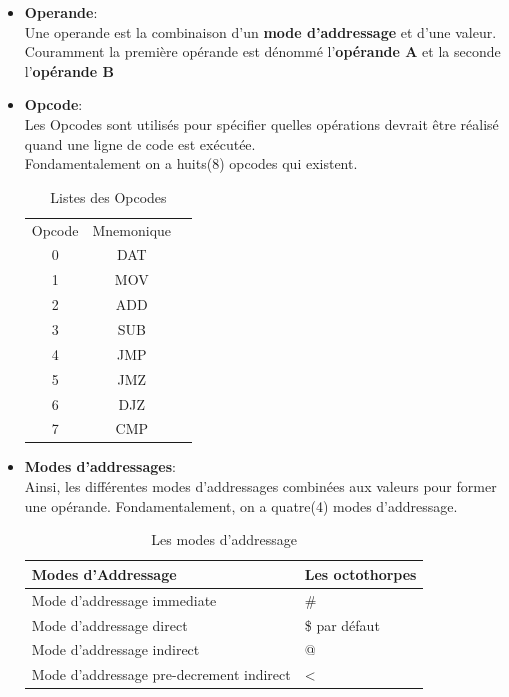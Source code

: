 \documentclass[12pt]{article}
\begin{document}
\begin{itemize}
	\item \textbf{Operande}:\\
	      Une operande est la combinaison d'un \textbf{mode d'addressage} et d'une valeur. Couramment la première opérande est dénommé l’\textbf{opérande A} et la seconde l’\textbf{opérande B}
	\item \textbf{Opcode}:\\
	      Les Opcodes sont utilisés pour spécifier quelles opérations devrait être réalisé quand une ligne de code est exécutée.\\
	      Fondamentalement on a huits(8) opcodes qui existent.\\
	      \begin{table}[h!]
		      \center
		      \begin{tabular}{|c|c|l}
			      \cline{1-2}
			      Opcode & Mnemonique & \\ \cline{1-2}
			      0      & DAT        & \\ \cline{1-2}
			      1      & MOV        & \\ \cline{1-2}
			      2      & ADD        & \\ \cline{1-2}
			      3      & SUB        & \\ \cline{1-2}
			      4      & JMP        & \\ \cline{1-2}
			      5      & JMZ        & \\ \cline{1-2}
			      6      & DJZ        & \\ \cline{1-2}
			      7      & CMP        & \\ \cline{1-2}
		      \end{tabular}
		      \caption{Listes des Opcodes}
	      \end{table}
	\item \textbf{Modes d'addressages}:\\
		Ainsi, les différentes modes d'addressages combinées aux valeurs pour former une opérande.
		Fondamentalement, on a quatre(4) modes d'addressage.
		\begin{table}[h!]
			\begin{tabular}{|l|l|}
			\hline
			Modes d'Addressage                       & Les octothorpes \\ \hline
			Mode d'addressage immediate              & \#              \\ \hline
			Mode d'addressage  direct                & \$ par défaut   \\ \hline
			Mode d'addressage indirect               & @               \\ \hline
			Mode d'addressage pre-decrement indirect & \textless{}     \\ \hline
			\end{tabular}
			\caption{Les modes d'addressage}
			\end{table}
			
\end{itemize}
\end{document}
